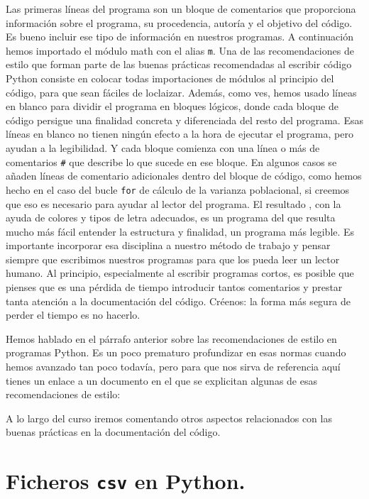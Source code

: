 \documentclass[10pt,a4paper]{article}\usepackage[]{graphicx}\usepackage[]{color}
\newcounter {cont01}
\begin{document}
Las primeras líneas del programa son un bloque de comentarios que proporciona información sobre el programa, su procedencia, autoría y el objetivo del código. Es bueno incluir ese tipo de información en nuestros programas. A continuación hemos importado el módulo math con el alias {\tt m}. Una de las {\sf recomendaciones de estilo} que forman parte de las buenas prácticas recomendadas al escribir código Python consiste en colocar todas importaciones de módulos al principio del código, para que sean fáciles de loclaizar. Además, como ves, hemos usado líneas en blanco para dividir el programa en bloques lógicos, donde cada bloque de código persigue una finalidad concreta y diferenciada del resto del programa. Esas líneas en blanco no tienen ningún efecto a la hora de ejecutar el programa, pero ayudan a la legibilidad. Y cada bloque comienza con una línea o más de comentarios \verb&#& que describe lo que sucede en ese bloque. En algunos casos se añaden líneas de comentario adicionales dentro del bloque de código, como hemos hecho en el caso del bucle {\tt for} de cálculo de la varianza poblacional, si creemos que eso es necesario para ayudar al lector del programa. El resultado , con la ayuda de colores y tipos de letra adecuados, es un programa del que resulta mucho más fácil entender la estructura y finalidad, un programa más legible. Es importante incorporar esa disciplina a nuestro método de trabajo y pensar siempre que escribimos nuestros programas para que los pueda leer un lector humano. Al principio, especialmente al escribir programas cortos, es posible que pienses que es una pérdida de tiempo introducir tantos comentarios y prestar tanta atención a la documentación del código. Créenos: la forma más segura de perder el tiempo es no hacerlo.

Hemos hablado en el párrafo anterior sobre las recomendaciones de estilo en programas Python. Es un poco prematuro profundizar en esas normas cuando hemos avanzado tan poco todavía, pero para que nos sirva de referencia aquí tienes un enlace a un documento en el que se explicitan algunas de esas recomendaciones de estilo:
\begin{center}
\end{center}

A lo largo del curso iremos comentando otros aspectos relacionados con las buenas prácticas en la documentación del código.

\section{Ficheros {\tt csv} en Python.}
\label{tut02:sec:ficherosCsvPython}
\end{document}

